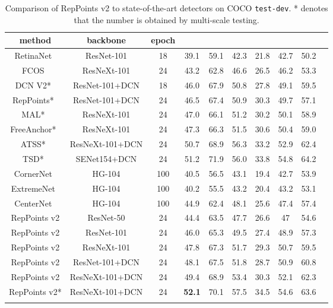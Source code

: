 \documentclass{article}
\begin{document}
\begin{table}
  \caption{Comparison of RepPoints v2 to state-of-the-art detectors on COCO \texttt{test-dev}. * denotes that the number is obtained by multi-scale testing.}
  \small
  \label{tab:sota}
  \centering
  \begin{tabular}{c|cc|ccccccc}
    \Xhline{1.0pt}
     method & backbone & epoch &  &  &  &  &  & \\
    \hline
    RetinaNet~\cite{RetinaNet} & ResNet-101 & 18 & 39.1 & 59.1 & 42.3 & 21.8 & 42.7 & 50.2 \\
    FCOS~\cite{tian2019fcos} & ResNeXt-101 & 24 & 43.2 & 62.8 & 46.6 & 26.5 & 46.2 & 53.3\\
    DCN V2*~\cite{zhu19deformv2} & ResNet-101+DCN & 18 & 46.0 & 67.9 & 50.8 & 27.8 & 49.1 & 59.5\\
    RepPoints*~\cite{yang19reppts} & ResNet-101+DCN & 24 & 46.5 & 67.4 & 50.9 & 30.3 & 49.7 & 57.1\\
    MAL*~\cite{wei20mal}& ResNeXt-101 & 24 & 47.0 & 66.1 & 51.2 & 30.2 & 50.1 & 58.9\\
    FreeAnchor*~\cite{zhang19freeanchor}& ResNeXt-101 & 24 & 47.3 & 66.3 & 51.5 & 30.6 & 50.4 & 59.0\\
    ATSS*~\cite{zhang2019atss} & ResNeXt-101+DCN & 24 & 50.7 & 68.9 & 56.3 & 33.2 & 52.9 & 62.4\\
    TSD*~\cite{song20tsd}& SENet154+DCN & 24 & 51.2 & 71.9 & 56.0 & 33.8 & 54.8 & 64.2\\
    \hline
    CornerNet~\cite{CornerNet} & HG-104 & 100 & 40.5 & 56.5 & 43.1 & 19.4 & 42.7 & 53.9\\
    ExtremeNet~\cite{ExtremeNet} & HG-104 & 100 & 40.2 & 55.5 & 43.2 & 20.4 & 43.2 & 53.1\\
    CenterNet~\cite{duan19center} & HG-104 & 100 & 44.9 & 62.4 & 48.1 & 25.6 & 47.4 & 57.4\\
    \hline
    RepPoints v2 & ResNet-50 & 24 & 44.4 & 63.5 & 47.7 & 26.6 & 47 & 54.6\\
    RepPoints v2 & ResNet-101 & 24 & 46.0 & 65.3 & 49.5 & 27.4 & 48.9 & 57.3\\
    RepPoints v2 & ResNeXt-101 & 24 & 47.8 & 67.3 & 51.7 & 29.3 & 50.7 & 59.5\\
    RepPoints v2 & ResNet-101+DCN & 24 & 48.1 & 67.5 & 51.8 & 28.7 & 50.9 & 60.8\\
    RepPoints v2 & ResNeXt-101+DCN & 24 & 49.4 & 68.9 & 53.4 & 30.3 & 52.1 & 62.3\\
    RepPoints v2* & ResNeXt-101+DCN & 24 & \textbf{52.1} & 70.1 & 57.5 & 34.5 & 54.6 & 63.6\\
    \Xhline{1.0pt}
  \end{tabular}
\end{table}
\end{document}
